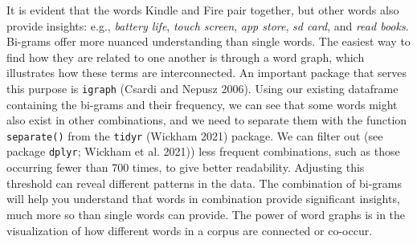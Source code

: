 It is evident that the words Kindle and Fire pair together, but other
words also provide insights: e.g., \emph{battery life}, \emph{touch
screen}, \emph{app store}, \emph{sd card}, and \emph{read books}.
Bi-grams offer more nuanced understanding than single words. The easiest
way to find how they are related to one another is through a word graph,
which illustrates how these terms are interconnected. An important
package that serves this purpose is \texttt{igraph} (Csardi and
Nepusz 2006). Using our existing dataframe containing
the bi-grams and their frequency, we can see that some words might also exist in other
combinations, and we need to separate them with the function
\texttt{separate()} from the \texttt{tidyr} (Wickham 2021) package. We can
filter out (see package \texttt{dplyr}; Wickham et al. 2021)) less
frequent combinations, such as those occurring fewer than 700 times, to give better readability. Adjusting this threshold can reveal different
patterns in the data. The combination of bi-grams will help you
understand that words in combination provide significant insights,
much more so than single words can provide. The power of word graphs is in the
visualization of how different words in a corpus are connected or
co-occur.

\begin{Shaded}
\begin{Highlighting}[]

\OtherTok{\textless{}{-}}\SpecialCharTok{\%\textgreater{}\%}
   \NormalTok{(}\NormalTok{, }\NormalTok{), } \NormalTok{) }\SpecialCharTok{\%\textgreater{}\%}
  \SpecialCharTok{\textgreater{}} \NormalTok{)}

\OtherTok{\textless{}{-}} 

\end{Highlighting}
\end{Shaded}

